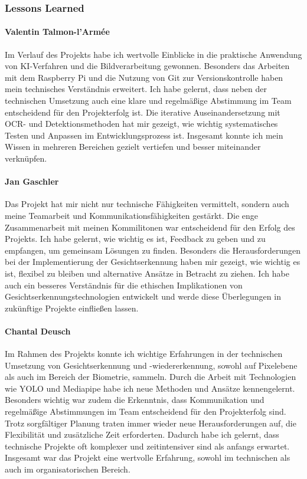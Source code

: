 \subsubsection{Lessons Learned}

\paragraph{Valentin Talmon-l'Armée} 
Im Verlauf des Projekts habe ich wertvolle Einblicke in die praktische Anwendung von KI-Verfahren und die Bildverarbeitung gewonnen. Besonders das Arbeiten mit dem Raspberry Pi und die Nutzung von Git zur Versionskontrolle haben mein technisches Verständnis erweitert. Ich habe gelernt, dass neben der technischen Umsetzung auch eine klare und regelmäßige Abstimmung im Team entscheidend für den Projekterfolg ist. Die iterative Auseinandersetzung mit OCR- und Detektionsmethoden hat mir gezeigt, wie wichtig systematisches Testen und Anpassen im Entwicklungsprozess ist. Insgesamt konnte ich mein Wissen in mehreren Bereichen gezielt vertiefen und besser miteinander verknüpfen.

\paragraph{Jan Gaschler}
Das Projekt hat mir nicht nur technische Fähigkeiten vermittelt, sondern auch meine Teamarbeit und Kommunikationsfähigkeiten gestärkt. Die enge Zusammenarbeit mit meinen Kommilitonen war entscheidend für den Erfolg des Projekts. Ich habe gelernt, wie wichtig es ist, Feedback zu geben und zu empfangen, um gemeinsam Lösungen zu finden. Besonders die Herausforderungen bei der Implementierung der Gesichtserkennung haben mir gezeigt, wie wichtig es ist, flexibel zu bleiben und alternative Ansätze in Betracht zu ziehen. Ich habe auch ein besseres Verständnis für die ethischen Implikationen von Gesichtserkennungstechnologien entwickelt und werde diese Überlegungen in zukünftige Projekte einfließen lassen.

\paragraph{Chantal Deusch}
Im Rahmen des Projekts konnte ich wichtige Erfahrungen in der technischen Umsetzung von Gesichtserkennung und -wiedererkennung, sowohl auf Pixelebene als auch im Bereich der Biometrie, sammeln. Durch die Arbeit mit Technologien wie YOLO und Mediapipe habe ich neue Methoden und Ansätze kennengelernt. Besonders wichtig war zudem die Erkenntnis, dass Kommunikation und regelmäßige Abstimmungen im Team entscheidend für den Projekterfolg sind. Trotz sorgfältiger Planung traten immer wieder neue Herausforderungen auf, die Flexibilität und zusätzliche Zeit erforderten. Dadurch habe ich gelernt, dass technische Projekte oft komplexer und zeitintensiver sind als anfangs erwartet. Insgesamt war das Projekt eine wertvolle Erfahrung, sowohl im technischen als auch im organisatorischen Bereich.

